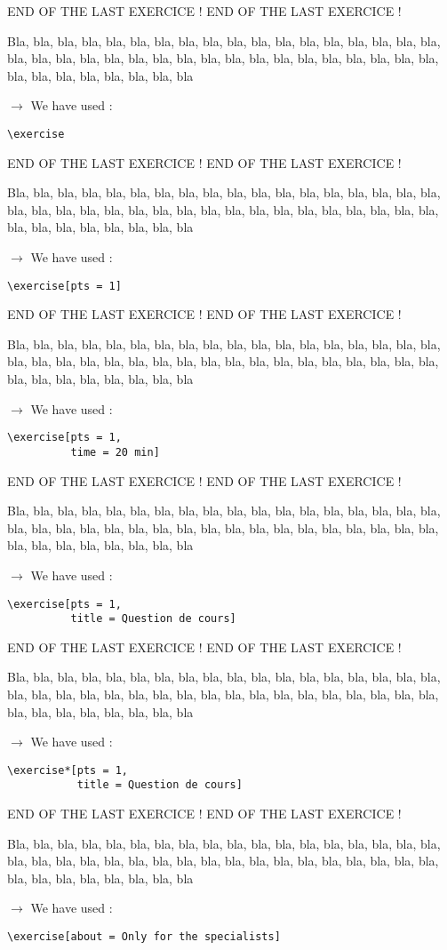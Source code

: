 \documentclass[12pt]{article}
\newcommand\blabla{%
		\noindent%
		Bla, bla, bla, bla, bla, bla, bla, bla, bla, bla, bla,
		bla, bla, bla, bla, bla, bla, bla, bla, bla, bla, bla,
		bla, bla, bla, bla, bla, bla, bla, bla, bla, bla, bla,
		bla, bla, bla, bla, bla, bla, bla, bla, bla, bla, bla
	}
\newcommand\codeused{%
		\blabla{} \medskip  \par
		\noindent $\rightarrow$ We have used :
	}
\begin{document}
\newpage \medskip \noindent END OF THE LAST EXERCICE ! END OF THE LAST EXERCICE !

\exercise

\codeused{}
\begin{verbatim}
\exercise
\end{verbatim}



\newpage \medskip \noindent END OF THE LAST EXERCICE ! END OF THE LAST EXERCICE !

\exercise[pts = 1]

\codeused{}
\begin{verbatim}
\exercise[pts = 1]
\end{verbatim}



\newpage \medskip \noindent END OF THE LAST EXERCICE ! END OF THE LAST EXERCICE !

\exercise[pts = 1, time = 20 min]

\codeused{}
\begin{verbatim}
\exercise[pts = 1,
          time = 20 min]
\end{verbatim}



\newpage \medskip \noindent END OF THE LAST EXERCICE ! END OF THE LAST EXERCICE !

\exercise[pts = 1,
          title = Question de cours]

\codeused{}
\begin{verbatim}
\exercise[pts = 1,
          title = Question de cours]
\end{verbatim}



\newpage \medskip \noindent END OF THE LAST EXERCICE ! END OF THE LAST EXERCICE !

\exercise*[pts = 1,
           title = Question de cours]

\codeused{}
\begin{verbatim}
\exercise*[pts = 1,
           title = Question de cours]
\end{verbatim}



\newpage \medskip \noindent END OF THE LAST EXERCICE ! END OF THE LAST EXERCICE !

\exercise[about = Only for the specialists]

\codeused{}
\begin{verbatim}
\exercise[about = Only for the specialists]
\end{verbatim}
\end{document}
